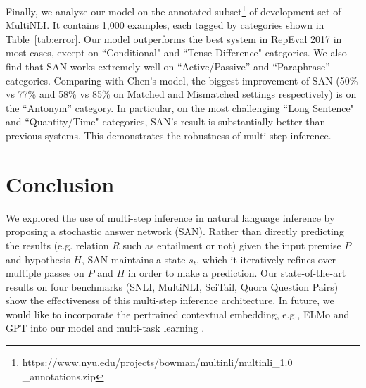 \documentclass[11pt,a4paper]{article}
\begin{document}
Finally, we analyze our model on the annotated subset\footnote{https://www.nyu.edu/projects/bowman/multinli/multinli\_1.0\\\_annotations.zip} of development set of MultiNLI. It contains 1,000 examples, each tagged by categories shown in Table~\ref{tab:error}. Our model outperforms the best system in RepEval 2017 \cite{2017arXiv171104289C} in most cases, except on ``Conditional" and ``Tense Difference" categories. 
We also find that SAN works extremely well on ``Active/Passive'' and ``Paraphrase'' categories. Comparing with Chen's model, the biggest improvement of SAN (50\% vs 77\% and 58\% vs 85\% on Matched and Mismatched settings respectively) is on the ``Antonym'' category.
In particular, on the most challenging ``Long Sentence" and ``Quantity/Time" categories, SAN's result is substantially better than previous systems. This demonstrates the robustness of multi-step inference. \section{Conclusion}
\label{sec:con}
We explored the use of multi-step inference in natural language inference by proposing a stochastic answer network (SAN).
Rather than directly predicting the results (e.g. relation $R$ such as entailment or not) given the input premise $P$ and hypothesis $H$, SAN maintains a state $s_t$, which it iteratively refines over multiple passes on $P$ and $H$ in order to make a prediction. 
Our state-of-the-art results on four benchmarks (SNLI, MultiNLI, SciTail, Quora Question Pairs) show the effectiveness of this multi-step inference architecture. In future, we would like to incorporate the pertrained contextual embedding, e.g., ELMo \cite{peters2018deep} and GPT \cite{radford2018improving} into our model and multi-task learning \cite{liu2019mt-dnn}.
 




\end{document}
